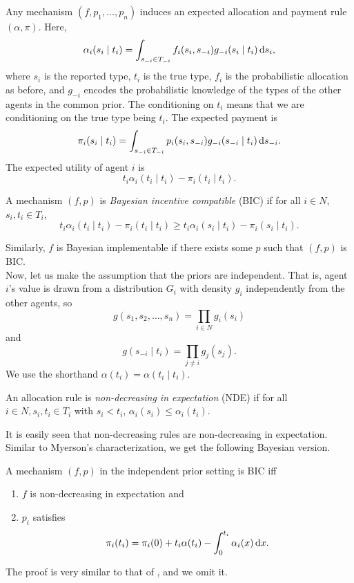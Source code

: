 		Any mechanism $(f,p_1,\ldots,p_n)$ induces an expected allocation and payment rule $(\alpha,\pi)$. Here,
		\[ \alpha_i(s_i \mid t_i) = \int_{s_{-i} \in T_{-i}} f_i(s_i,s_{-i}) g_{-i}(s_i\mid t_i) \dif s_i, \]
		where $s_i$ is the reported type, $t_i$ is the true type, $f_i$ is the probabilistic allocation as before, and $g_{-i}$ encodes the probabilistic knowledge of the types of the other agents in the common prior. The conditioning on $t_i$ means that we are conditioning on the true type being $t_i$. The expected payment is
		\[ \pi_i(s_i\mid t_i) = \int_{s_{-i} \in T_{-i}} p_i(s_i,s_{-i}) g_{-i}(s_{-i} \mid t_i) \dif s_{-i}. \]
		The expected utility of agent $i$ is
		\[ t_i \alpha_i(t_i \mid t_i) - \pi_i(t_i \mid t_i). \]

		\begin{fdef}
			A mechanism $(f,p)$ is \emph{Bayesian incentive compatible} (BIC) if for all $i \in N$, $s_i,t_i \in T_i$,
			\[ t_i \alpha_i(t_i \mid t_i) - \pi_i(t_i \mid t_i) \ge t_i \alpha_i(s_i \mid t_i) - \pi_i(s_i \mid t_i). \]
		\end{fdef}
		Similarly, $f$ is Bayesian implementable if there exists some $p$ such that $(f,p)$ is BIC.\\

		Now, let us make the assumption that the priors are independent. That is, agent $i$'s value is drawn from a distribution $G_i$ with density $g_i$ independently from the other agents, so
		\[ g(s_1,s_2,\ldots,s_n) = \prod_{i \in N} g_i(s_i) \]
		and
		\[ g(s_{-i} \mid t_i) = \prod_{j \ne i} g_j(s_j). \]
		We use the shorthand $\alpha(t_i) = \alpha(t_i \mid t_i)$.

		\begin{fdef}
			An allocation rule is \emph{non-decreasing in expectation} (NDE) if for all $i \in N, s_i,t_i \in T_i$ with $s_i < t_i$, $\alpha_i(s_i) \le \alpha_i(t_i)$.
		\end{fdef}
		It is easily seen that non-decreasing rules are non-decreasing in expectation.\\
		Similar to Myerson's characterization, we get the following Bayesian version.

		\begin{ftheo}
			\label{bic char}
			A mechanism $(f,p)$ in the independent prior setting is BIC iff
			\begin{enumerate}
				\item $f$ is non-decreasing in expectation and
				\item $p_i$ satisfies
				\[ \pi_i(t_i) = \pi_i(0) + t_i \alpha(t_i) - \int_0^{t_i} \alpha_i(x) \dif x. \]
			\end{enumerate}
		\end{ftheo}
		The proof is very similar to that of , and we omit it.

